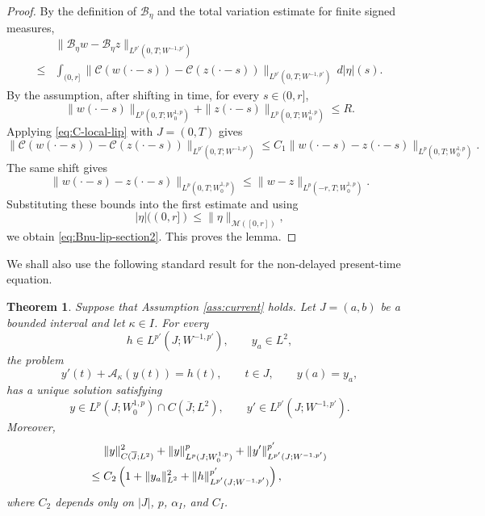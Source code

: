 \documentclass[a4paper,11pt,oneside,reqno]{amsart}
\newtheorem{theorem}{Theorem}[section]
\newcounter{c}
\newcounter{d}
\newcounter{b}
\newcommand{\M}{\mathcal{M}}
\begin{document}
\begin{proof}
By the definition of $\mathcal B_\eta$ and the total variation estimate for
finite signed measures,
\[
\begin{aligned}
&\|\mathcal B_\eta w-\mathcal B_\eta z\|_{L^{p'}(0,T;W^{-1,p'})} \\
\le{}&
 \int_{(0,r]}
 \bigl\|
 \mathcal C(w(\cdot-s))-\mathcal C(z(\cdot-s))
 \bigr\|_{L^{p'}(0,T;W^{-1,p'})}
 \,d|\eta|(s).
\end{aligned}
\]
By the assumption, after shifting in time, for every $s\in(0,r]$,
\[
 \|w(\cdot-s)\|_{L^p(0,T;W^{1,p}_0)}
 +
 \|z(\cdot-s)\|_{L^p(0,T;W^{1,p}_0)}
 \le R.
\]
Applying \eqref{eq:C-local-lip} with $J=(0,T)$ gives
\[
 \bigl\|
 \mathcal C(w(\cdot-s))-\mathcal C(z(\cdot-s))
 \bigr\|_{L^{p'}(0,T;W^{-1,p'})}
 \le
C_1
 \|w(\cdot-s)-z(\cdot-s)\|_{L^p(0,T;W^{1,p}_0)}.
\]
The same shift gives
\[
 \|w(\cdot-s)-z(\cdot-s)\|_{L^p(0,T;W^{1,p}_0)}
 \le
 \|w-z\|_{L^p(-r,T;W^{1,p}_0)}.
\]
Substituting these bounds into the first estimate and using
\[
 |\eta|((0,r])\le \|\eta\|_{\M([0,r])},
\]
we obtain \eqref{eq:Bnu-lip-section2}. This proves the lemma.
\end{proof}


We shall also use the following standard result for the non-delayed
present-time equation.

\begin{theorem}\label{thm:nondelayed-problem}
Suppose that Assumption \ref{ass:current} holds.
Let $J=(a,b)$ be a bounded interval and let $\kappa\in I$. For every
\[
 h\in L^{p'}(J;W^{-1,p'}),\qquad y_a\in L^2,
\]
the problem
\begin{equation}
 y'(t)+\mathcal A_\kappa(y(t))=h(t),
 \qquad t\in J,
 \qquad y(a)=y_a,
 \label{eq:nondelayed-problem}
\end{equation}
has a unique solution satisfying
\[
 y\in L^p(J;W^{1,p}_0)\cap C(\overline J;L^2),
 \qquad
 y'\in L^{p'}(J;W^{-1,p'}).
\]
Moreover,
\begin{align}
 &\|y\|_{C(\overline J;L^2)}^2
 +\|y\|_{L^p(J;W^{1,p}_0)}^p
 +\|y'\|_{L^{p'}(J;W^{-1,p'})}^{p'}
 \notag\\
 \le{}&
 C_2\left(
 1+\|y_a\|_{L^2}^2
 +\|h\|_{L^{p'}(J;W^{-1,p'})}^{p'}
 \right),
 \label{eq:nondelayed-estimate}
\end{align}
where $C_2$ depends only on $|J|$, $p$, $\alpha_I$, and $C_I$.
\end{theorem}
\end{document}
